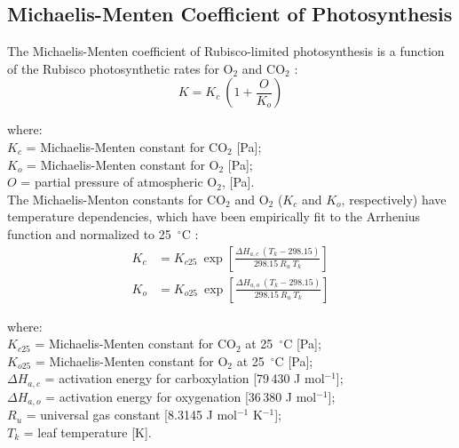 \subsection{Michaelis-Menten Coefficient of Photosynthesis}
\label{sec:k}
%
The Michaelis-Menten coefficient of Rubisco-limited photosynthesis is a function of the Rubisco photosynthetic rates for O$_2$ and CO$_2$ \parencite{farquhar80}:
\begin{equation}
\label{eq:michaelis}
	K = K_c\: \left( 1 + \frac{O}{K_o} \right)
\end{equation}

\noindent where:\\
\indent $K_c$ = Michaelis-Menten constant for CO$_2$ [Pa];\\
\indent $K_o$ = Michaelis-Menten constant for O$_2$ [Pa];\\
\indent $O$ = partial pressure of atmospheric O$_2$, [Pa].\\

\noindent The Michaelis-Menton constants for CO$_2$ and O$_2$ ($K_c$ and $K_o$, respectively) have temperature dependencies, which have been empirically fit to the Arrhenius function and normalized to 25~$^\circ$C \parencite{farquhar80}:
%
%
\begin{subequations}
\label{eq:kcko}
\begin{align}
	K_c&=K_{c25}\: \exp \left[ 
    	\frac{\Delta H_{a,c}\: \left(T_k-298.15\right)}{298.15\: R_{u}\: T_k}
    \right] \label{eq:kc} \\
    K_o&=K_{o25}\: \exp \left[ 
    	\frac{\Delta H_{a,o}\: \left(T_k-298.15\right)}{298.15\: R_{u}\: T_k}
    \right] \label{eq:ko}
\end{align}
\end{subequations}

\noindent where:\\
\indent $K_{c25}$ = Michaelis-Menten constant for CO$_2$ at 25~$^{\circ}$C [Pa];\\
\indent $K_{o25}$ = Michaelis-Menten constant for O$_2$ at 25~$^{\circ}$C [Pa];\\
\indent $\Delta H_{a,c}$ = activation energy for carboxylation [79$\,$430 J mol$^{-1}$];\\
\indent $\Delta H_{a,o}$ = activation energy for oxygenation [36$\,$380 J mol$^{-1}$];\\
\indent $R_{u}$ = universal gas constant [8.3145 J mol$^{-1}$ K$^{-1}$];\\
\indent $T_k$ = leaf temperature [K].\\

